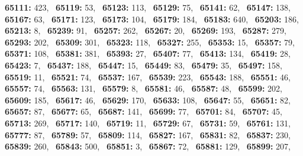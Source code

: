 \textbf{65111:} 423,\allowbreak~ 
\textbf{65119:} 53,\allowbreak~ 
\textbf{65123:} 113,\allowbreak~ 
\textbf{65129:} 75,\allowbreak~ 
\textbf{65141:} 62,\allowbreak~ 
\textbf{65147:} 138,\allowbreak~ 
\textbf{65167:} 63,\allowbreak~ 
\textbf{65171:} 123,\allowbreak~ 
\textbf{65173:} 104,\allowbreak~ 
\textbf{65179:} 184,\allowbreak~ 
\textbf{65183:} 640,\allowbreak~ 
\textbf{65203:} 186,\allowbreak~ 
\textbf{65213:} 8,\allowbreak~ 
\textbf{65239:} 91,\allowbreak~ 
\textbf{65257:} 262,\allowbreak~ 
\textbf{65267:} 20,\allowbreak~ 
\textbf{65269:} 193,\allowbreak~ 
\textbf{65287:} 279,\allowbreak~ 
\textbf{65293:} 202,\allowbreak~ 
\textbf{65309:} 301,\allowbreak~ 
\textbf{65323:} 118,\allowbreak~ 
\textbf{65327:} 255,\allowbreak~ 
\textbf{65353:} 15,\allowbreak~ 
\textbf{65357:} 79,\allowbreak~ 
\textbf{65371:} 108,\allowbreak~ 
\textbf{65381:} 381,\allowbreak~ 
\textbf{65393:} 27,\allowbreak~ 
\textbf{65407:} 77,\allowbreak~ 
\textbf{65413:} 134,\allowbreak~ 
\textbf{65419:} 28,\allowbreak~ 
\textbf{65423:} 7,\allowbreak~ 
\textbf{65437:} 188,\allowbreak~ 
\textbf{65447:} 15,\allowbreak~ 
\textbf{65449:} 83,\allowbreak~ 
\textbf{65479:} 35,\allowbreak~ 
\textbf{65497:} 158,\allowbreak~ 
\textbf{65519:} 11,\allowbreak~ 
\textbf{65521:} 74,\allowbreak~ 
\textbf{65537:} 167,\allowbreak~ 
\textbf{65539:} 223,\allowbreak~ 
\textbf{65543:} 188,\allowbreak~ 
\textbf{65551:} 46,\allowbreak~ 
\textbf{65557:} 74,\allowbreak~ 
\textbf{65563:} 131,\allowbreak~ 
\textbf{65579:} 8,\allowbreak~ 
\textbf{65581:} 46,\allowbreak~ 
\textbf{65587:} 48,\allowbreak~ 
\textbf{65599:} 202,\allowbreak~ 
\textbf{65609:} 185,\allowbreak~ 
\textbf{65617:} 46,\allowbreak~ 
\textbf{65629:} 170,\allowbreak~ 
\textbf{65633:} 108,\allowbreak~ 
\textbf{65647:} 55,\allowbreak~ 
\textbf{65651:} 82,\allowbreak~ 
\textbf{65657:} 87,\allowbreak~ 
\textbf{65677:} 65,\allowbreak~ 
\textbf{65687:} 141,\allowbreak~ 
\textbf{65699:} 77,\allowbreak~ 
\textbf{65701:} 84,\allowbreak~ 
\textbf{65707:} 45,\allowbreak~ 
\textbf{65713:} 269,\allowbreak~ 
\textbf{65717:} 140,\allowbreak~ 
\textbf{65719:} 11,\allowbreak~ 
\textbf{65729:} 67,\allowbreak~ 
\textbf{65731:} 59,\allowbreak~ 
\textbf{65761:} 131,\allowbreak~ 
\textbf{65777:} 87,\allowbreak~ 
\textbf{65789:} 57,\allowbreak~ 
\textbf{65809:} 114,\allowbreak~ 
\textbf{65827:} 167,\allowbreak~ 
\textbf{65831:} 82,\allowbreak~ 
\textbf{65837:} 230,\allowbreak~ 
\textbf{65839:} 260,\allowbreak~ 
\textbf{65843:} 500,\allowbreak~ 
\textbf{65851:} 3,\allowbreak~ 
\textbf{65867:} 72,\allowbreak~ 
\textbf{65881:} 129,\allowbreak~ 
\textbf{65899:} 207,\allowbreak~ 
